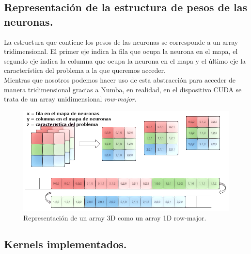 \subsection{Representación de la estructura de pesos de las neuronas.}
La estructura que contiene los pesos de las neuronas se corresponde a un array tridimensional. El primer eje indica la fila que ocupa la neurona en el mapa, el segundo eje indica la columna que ocupa la neurona en el mapa y el último eje la característica del problema a la que queremos acceder.\\

Mientras que nosotros podemos hacer uso de esta abstracción para acceder de manera tridimensional gracias a Numba, en realidad, en el dispositivo CUDA se trata de un array unidimensional \textit{row-major}.


\begin{figure}[ht]
\centering
\includegraphics[scale=2.0]{imagenes/row-major.png}
\caption{Representación de un array 3D como un array 1D row-major.}
\label{image:rowmajor}
\end{figure}

\subsection{Kernels implementados.}
